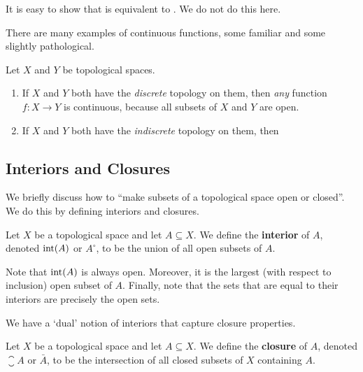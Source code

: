 It is easy to show that  is equivalent to . We do not do this here.

There are many examples of continuous functions, some familiar and some slightly pathological.

\begin{boxexample}
    Let $X$ and $Y$ be topological spaces.
    \begin{enumerate}
        \item If $X$ and $Y$ both have the \textit{discrete} topology on them, then \textit{any} function $f : X \to Y$ is continuous, because all subsets of $X$ and $Y$ are open.

        \item If $X$ and $Y$ both have the \textit{indiscrete} topology on them, then \sorry
    \end{enumerate}
\end{boxexample}

\subsection{Interiors and Closures}

We briefly discuss how to ``make subsets of a topological space open or closed''. We do this by defining interiors and closures.

\begin{boxdefinition}
    Let $X$ be a topological space and let $A \subseteq X$. We define the \textbf{interior} of $A$, denoted $\operatorname{int}\!\left( A \right)$ or $A^{\circ}$, to be the union of all open subsets of $A$.
\end{boxdefinition}

Note that $\operatorname{int}\!\left( A \right)$ is always open. Moreover, it is the largest (with respect to inclusion) open subset of $A$. Finally, note that the sets that are equal to their interiors are precisely the open sets.

We have a `dual' notion of interiors that capture closure properties.


\begin{boxdefinition}[Closure]
    Let $X$ be a topological space and let $A \subseteq X$. We define the \textbf{closure} of $A$, denoted $\closure{A}$ or $\bar{A}$, to be the intersection of all closed subsets of $X$ containing $A$.
\end{boxdefinition}


